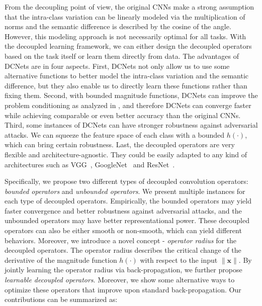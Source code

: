 \par
From the decoupling point of view, the original CNNs make a strong assumption that the intra-class variation can be linearly modeled via the multiplication of norms and the semantic difference is described by the cosine of the angle. However, this modeling approach is not necessarily optimal for all tasks. With the decoupled learning framework, we can either design the decoupled operators based on the task itself or learn them directly from data. The advantages of DCNets are in four aspects. First, DCNets not only allow us to use some alternative functions to better model the intra-class variation and the semantic difference, but they also enable us to directly learn these functions rather than fixing them. Second, with bounded magnitude functions, DCNets can improve the problem conditioning as analyzed in \cite{liu2017deephyper}, and therefore DCNets can converge faster while achieving comparable or even better accuracy than the original CNNs. Third, some instances of DCNets can have stronger robustness against adversarial attacks. We can squeeze the feature space of each class with a bounded $h(\cdot)$, which can bring certain robustness. Last, the decoupled operators are very flexible and architecture-agnostic. They could be easily adapted to any kind of architectures such as VGG~\cite{simonyan2014very}, GoogleNet~\cite{szegedy2015going} and ResNet~\cite{he2016deep}.
\par
Specifically, we propose two different types of decoupled convolution operators: \emph{bounded operators} and \emph{unbounded operators}. We present multiple instances for each type of decoupled operators. Empirically, the bounded operators may yield faster convergence and better robustness against adversarial attacks, and the unbounded operators may have better representational power. These decoupled operators can also be either smooth or non-smooth, which can yield different behaviors. Moreover, we introduce a novel concept - \emph{operator radius} for the decoupled operators. The operator radius describes the critical change of the derivative of the magnitude function $h(\cdot)$ with respect to the input $\|\bm{x}\|$. By jointly learning the operator radius via back-propagation, we further propose \emph{learnable decoupled operators}. Moreover, we show some alternative ways to optimize these operators that improve upon standard back-propagation. Our contributions can be summarized as:
\par

